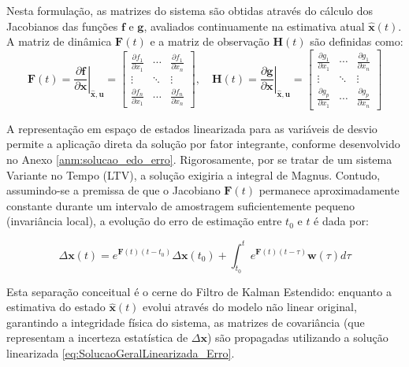 \documentclass[a4paper,12pt]{article}
\begin{document}
Nesta formulação, as matrizes do sistema são obtidas através do cálculo dos Jacobianos das funções $\mathbf{f}$ e $\mathbf{g}$, avaliados continuamente na estimativa atual $\hat{\mathbf{x}}(t)$. A matriz de dinâmica $\mathbf{F}(t)$ e a matriz de observação $\mathbf{H}(t)$ são definidas como:
\begin{equation}
    \mathbf{F}(t) = \left. \frac{\partial \mathbf{f}}{\partial \mathbf{x}} \right|_{\hat{\mathbf{x}}, \mathbf{u}} = 
    \begin{bmatrix}
        \frac{\partial f_1}{\partial x_1} & \cdots & \frac{\partial f_1}{\partial x_n} \\
        \vdots & \ddots & \vdots \\
        \frac{\partial f_n}{\partial x_1} & \cdots & \frac{\partial f_n}{\partial x_n}
    \end{bmatrix}, \quad
    \mathbf{H}(t) = \left. \frac{\partial \mathbf{g}}{\partial \mathbf{x}} \right|_{\hat{\mathbf{x}}, \mathbf{u}} = 
    \begin{bmatrix}
        \frac{\partial g_1}{\partial x_1} & \cdots & \frac{\partial g_1}{\partial x_n} \\
        \vdots & \ddots & \vdots \\
        \frac{\partial g_p}{\partial x_1} & \cdots & \frac{\partial g_p}{\partial x_n}
    \end{bmatrix}
\end{equation}

A representação em espaço de estados linearizada para as variáveis de desvio permite a aplicação direta da solução por fator integrante, conforme desenvolvido no Anexo \ref{anm:solucao_edo_erro}. Rigorosamente, por se tratar de um sistema Variante no Tempo (LTV), a solução exigiria a integral de Magnus. Contudo, assumindo-se a premissa de que o Jacobiano $\mathbf{F}(t)$ permanece aproximadamente constante durante um intervalo de amostragem suficientemente pequeno (invariância local), a evolução do erro de estimação entre $t_0$ e $t$ é dada por:

\begin{equation}
    \Delta\mathbf{x}(t) = e^{\mathbf{F}(t)(t-t_0)}\Delta\mathbf{x}(t_0) + \int_{t_0}^t e^{\mathbf{F}(t)(t-\tau)} \mathbf{w}(\tau) d\tau
    \label{eq:SolucaoGeralLinearizada_Erro}
\end{equation}

Esta separação conceitual é o cerne do Filtro de Kalman Estendido: enquanto a estimativa do estado $\hat{\mathbf{x}}(t)$ evolui através do modelo não linear original, garantindo a integridade física do sistema, as matrizes de covariância (que representam a incerteza estatística de $\Delta\mathbf{x}$) são propagadas utilizando a solução linearizada \eqref{eq:SolucaoGeralLinearizada_Erro}.
\end{document}
